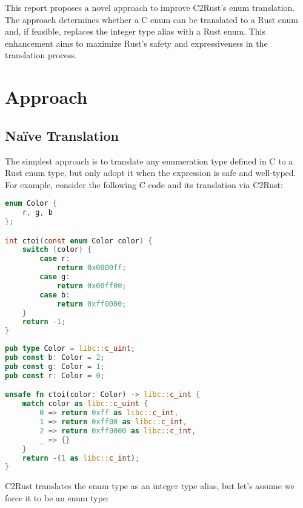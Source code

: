 \documentclass[10pt,conference]{IEEEtran}
\begin{document}
This report proposes a novel approach to improve C2Rust's enum translation. The approach determines whether a C enum can be translated to a Rust enum and, if feasible, replaces the integer type alias with a Rust enum. This enhancement aims to maximize Rust's safety and expressiveness in the translation process.

\section{Approach}
\subsection{Na\"ive Translation}


The simplest approach is to translate any enumeration type defined in C to a Rust enum type, but only adopt it when the expression is safe and well-typed. For example, consider the following C code and its translation via C2Rust:

\begin{lstlisting}[language=C]
enum Color {
    r, g, b
};

int ctoi(const enum Color color) {
    switch (color) {
        case r:
            return 0x0000ff;
        case g:
            return 0x00ff00;
        case b:
            return 0xff0000;
    }
    return -1;
}
\end{lstlisting}

\begin{lstlisting}[language=Rust]
pub type Color = libc::c_uint;
pub const b: Color = 2;
pub const g: Color = 1;
pub const r: Color = 0;

unsafe fn ctoi(color: Color) -> libc::c_int {
    match color as libc::c_uint {
        0 => return 0xff as libc::c_int,
        1 => return 0xff00 as libc::c_int,
        2 => return 0xff0000 as libc::c_int,
        _ => {}
    }
    return -(1 as libc::c_int);
}
\end{lstlisting}


C2Rust translates the enum type as an integer type alias, but let's assume we force it to be an enum type:
\end{document}
